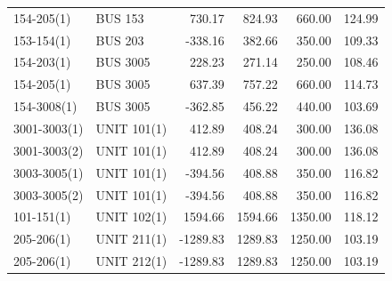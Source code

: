 \documentclass[10pt]{report}
\begin{document}
\begin{table}[H]
{\begin{tabular}{llrrrr}
154-205(1) & BUS 153 & 730.17 & 824.93 & 660.00 & 124.99 \\
153-154(1) & BUS 203 & -338.16 & 382.66 & 350.00 & 109.33 \\
154-203(1) & BUS 3005 & 228.23 & 271.14 & 250.00 & 108.46 \\
154-205(1) & BUS 3005 & 637.39 & 757.22 & 660.00 & 114.73 \\
154-3008(1) & BUS 3005 & -362.85 & 456.22 & 440.00 & 103.69 \\
3001-3003(1) & UNIT 101(1) & 412.89 & 408.24 & 300.00 & 136.08 \\
3001-3003(2) & UNIT 101(1) & 412.89 & 408.24 & 300.00 & 136.08 \\
3003-3005(1) & UNIT 101(1) & -394.56 & 408.88 & 350.00 & 116.82 \\
3003-3005(2) & UNIT 101(1) & -394.56 & 408.88 & 350.00 & 116.82 \\
101-151(1) & UNIT 102(1) & 1594.66 & 1594.66 & 1350.00 & 118.12 \\
205-206(1) & UNIT 211(1) & -1289.83 & 1289.83 & 1250.00 & 103.19 \\
205-206(1) & UNIT 212(1) & -1289.83 & 1289.83 & 1250.00 & 103.19 \\
\bottomrule
\end{tabular}}
\end{table}
\end{document}
